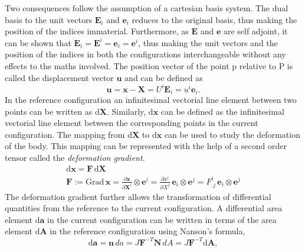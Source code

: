 Two consequences follow the assumption of a cartesian basis system. The dual basis to the unit vectors $\boldsymbol{{E}}_{{i}}$ and $\boldsymbol{{e}}_{{i}}$
 reduces to the original basis, thus making the position of the indices immaterial. Furthermore, as $\boldsymbol{E}$ and $\boldsymbol{e}$ are self adjoint,
 it can be shown that $\boldsymbol{{E}}_{{i}} = \boldsymbol{{E}}^{{i}} = \boldsymbol{{e}}_{{i}} = \boldsymbol{{e}}^{{i}}$, thus making the unit
 vectors and the position of the indices in both the configurations interchangeable without any effects to the maths involved.
The position vector of the point $\mathrm{p}$ relative to $\mathrm{P}$ is called the displacement vector $\boldsymbol{{u}}$ and can be defined as
\begin{equation} \label{displacement_vector}
    \boldsymbol{{u}} = \boldsymbol{{x}} - \boldsymbol{{X}} = {U}^{{i}} \boldsymbol{{E}}_{{i}} = {u}^{{i}} \boldsymbol{{e}}_{{i}}.
\end{equation}
In the reference configuration an infinitesimal vectorial line element between two points can be written as $\mathrm{d}\boldsymbol{X}$.
 Similarly, $\mathrm{d}\boldsymbol{x}$ can be defined as the infinitesimal vectorial line element between the corresponding points in the current configuration.
 The mapping from $\mathrm{d\boldsymbol{X}}$ to $\mathrm{d\boldsymbol{x}}$ can be used to study the deformation of the body. This
 mapping can be represented with the help of a second order tensor called the \emph{deformation gradient}.
 \begin{gather} \label{deformation_gradient}
    \mathrm{d}\boldsymbol{x} = \boldsymbol{{F}} \, \mathrm{d}\boldsymbol{X} \\
    \boldsymbol{{F}} := \mathrm{Grad} \, \boldsymbol{{x}} = \frac{\partial \boldsymbol{{x}}}{\partial \boldsymbol{{X}}^{{i}}} \otimes \boldsymbol{{e}}^{{i}} = \frac{\partial{x}^{i}}{\partial {X}^{{j}}} \, \boldsymbol{{e}}_{{i}} \otimes \boldsymbol{{e}}^{{j}} = {F}^{{i}}_{.j} \, \boldsymbol{e}_{i} \otimes \boldsymbol{e}^{j} 
\end{gather}
The deformation gradient further allows the transformation of differential quantities from the reference to the current configuration.
 A differential area element $\mathrm{d}\boldsymbol{a}$ in the current configuration can be written in terms of the area element $\mathrm{d}\boldsymbol{A}$ in the reference configuration
 using Nanson's formula,
 \begin{equation} \label{Nansons}
    \mathrm{d}\boldsymbol{a} = \mathbf{n} \,da = J \boldsymbol{F}^{-T} \boldsymbol{N} \,dA = J \boldsymbol{F}^{-T} \mathrm{d}\boldsymbol{A},
 \end{equation}
